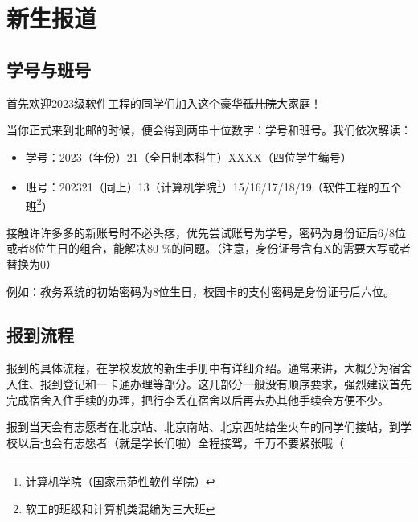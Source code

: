 \section{新生报道}

\subsection{学号与班号}

首先欢迎2023级软件工程的同学们加入这个豪华\sout{孤儿院}大家庭！

当你正式来到北邮的时候，便会得到两串十位数字：学号和班号。我们依次解读：
\begin{itemize}
    \itshape
    \item 学号：2023（年份）21（全日制本科生）XXXX（四位学生编号）
    \item 班号：202321（同上）13（计算机学院\footnote{计算机学院（国家示范性软件学院）}）15/16/17/18/19（软件工程的五个班\footnote{软工的班级和计算机类混编为三大班}）
\end{itemize}

接触许许多多的新账号时不必头疼，优先尝试账号为学号，密码为身份证后6/8位或者8位生日的组合，能解决80 \%的问题。（注意，身份证号含有X的需要大写或者替换为0）

例如：教务系统的初始密码为8位生日，校园卡的支付密码是身份证号后六位。

\subsection{报到流程}

报到的具体流程，在学校发放的新生手册中有详细介绍。通常来讲，大概分为宿舍入住、报到登记和一卡通办理等部分。这几部分一般没有顺序要求，强烈建议首先完成宿舍入住手续的办理，把行李丢在宿舍以后再去办其他手续会方便不少。

报到当天会有志愿者在北京站、北京南站、北京西站给坐火车的同学们接站，到学校以后也会有志愿者（就是学长们啦）全程接驾，千万不要紧张哦（
